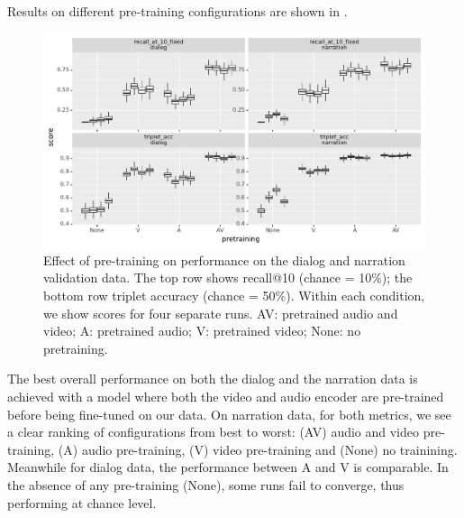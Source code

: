 Results on different pre-training configurations are shown in
.
\begin{figure}[htb]
	\centering
	\includegraphics[width=\textwidth]{results/ablations/pretraining.pdf}
	\caption{Effect of pre-training on performance on the dialog
          and narration validation data. The top row shows recall@10
          (chance = 10\%); the bottom row triplet accuracy (chance =
          50\%). Within each condition, we show scores for four
          separate runs. AV: pretrained audio and video; A: pretrained
          audio; V: pretrained video; None: no pretraining.}
	\label{fig:pretraining}
      \end{figure}

The best overall performance on both the dialog and the narration data is 
achieved with a model where both the video and audio encoder are pre-trained 
before being fine-tuned on our data. On narration data, for both metrics,
we see a clear ranking of
configurations from best to worst: (AV) audio and video pre-training,
(A) audio pre-training, (V) video pre-training and (None) no
trainining. Meanwhile for dialog data, the performance between A and V
is comparable. In the absence of any pre-training (None),
some runs fail to converge, thus performing at chance level.

